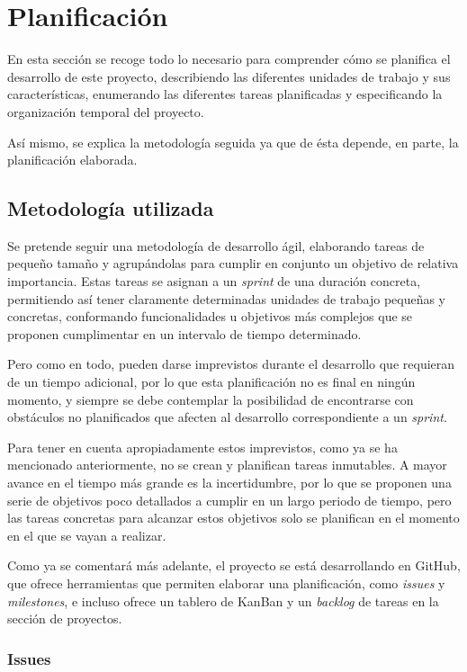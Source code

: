 \chapter{Planificación}

En esta sección se recoge todo lo necesario para comprender cómo se planifica el desarrollo de este proyecto, describiendo las diferentes unidades de trabajo y sus características, enumerando las diferentes tareas planificadas y especificando la organización temporal del proyecto.

Así mismo, se explica la metodología seguida ya que de ésta depende, en parte, la planificación elaborada.

\section{Metodología utilizada}

Se pretende seguir una metodología de desarrollo ágil, elaborando tareas de pequeño tamaño y agrupándolas para cumplir en conjunto un objetivo de relativa importancia. Estas tareas se asignan a un \textit{sprint} de una duración concreta, permitiendo así tener claramente determinadas unidades de trabajo pequeñas y concretas, conformando funcionalidades u objetivos más complejos que se proponen cumplimentar en un intervalo de tiempo determinado.

Pero como en todo, pueden darse imprevistos durante el desarrollo que requieran de un tiempo adicional, por lo que esta planificación no es final en ningún momento, y siempre se debe contemplar la posibilidad de encontrarse con obstáculos no planificados que afecten al desarrollo correspondiente a un \textit{sprint}.

Para tener en cuenta apropiadamente estos imprevistos, como ya se ha mencionado anteriormente, no se crean y planifican tareas inmutables. A mayor avance en el tiempo más grande es la incertidumbre, por lo que se proponen una serie de objetivos poco detallados a cumplir en un largo periodo de tiempo, pero las tareas concretas para alcanzar estos objetivos solo se planifican en el momento en el que se vayan a realizar.

Como ya se comentará más adelante, el proyecto se está desarrollando en GitHub\cite{Github}, que ofrece herramientas que permiten elaborar una planificación, como \textit{issues} y \textit{milestones}, e incluso ofrece un tablero de KanBan y un \textit{backlog} de tareas en la sección de proyectos.

\subsection{Issues}

